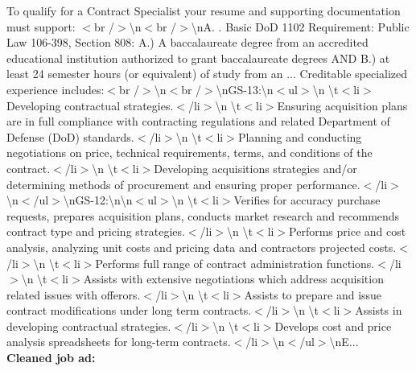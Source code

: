 \documentclass[12pt]{article}
\begin{document}
To qualify for a Contract Specialist your resume and supporting documentation must support: $<$br /$>$\textbackslash n$<$br /$>$\textbackslash nA. . Basic DoD 1102 Requirement: Public Law 106-398, Section 808: A.) A baccalaureate degree from an accredited educational institution authorized to grant baccalaureate degrees AND B.) at least 24 semester hours (or equivalent) of study from an ... Creditable specialized experience includes:$<$br /$>$\textbackslash n$<$br /$>$\textbackslash nGS-13:\textbackslash n$<$ul$>$\textbackslash n \textbackslash t$<$li$>$Developing contractual strategies.$<$/li$>$\textbackslash n \textbackslash t$<$li$>$Ensuring acquisition plans are in full compliance with contracting regulations and related Department of Defense (DoD) standards.$<$/li$>$\textbackslash n \textbackslash t$<$li$>$Planning and conducting negotiations on price, technical requirements, terms, and conditions of the contract.$<$/li$>$\textbackslash n \textbackslash t$<$li$>$Developing acquisitions strategies and/or determining methods of procurement and ensuring proper performance.$<$/li$>$\textbackslash n$<$/ul$>$\textbackslash nGS-12:\textbackslash n\textbackslash n$<$ul$>$\textbackslash n \textbackslash t$<$li$>$Verifies for accuracy purchase requests, prepares acquisition plans, conducts market research and recommends contract type and pricing strategies.$<$/li$>$\textbackslash n \textbackslash t$<$li$>$Performs price and cost analysis, analyzing unit costs and pricing data and contractors projected costs.$<$/li$>$\textbackslash n \textbackslash t$<$li$>$Performs full range of contract administration functions.$<$/li$>$\textbackslash n \textbackslash t$<$li$>$Assists with extensive negotiations which address acquisition related issues with offerors.$<$/li$>$\textbackslash n \textbackslash t$<$li$>$Assists to prepare and issue contract modifications under long term contracts.$<$/li$>$\textbackslash n \textbackslash t$<$li$>$Assists in developing contractual strategies.$<$/li$>$\textbackslash n \textbackslash t$<$li$>$Develops cost and price analysis spreadsheets for long-term contracts.$<$/li$>$\textbackslash n$<$/ul$>$\textbackslash nE...\\

\noindent \textbf{Cleaned job ad:}\\
\end{document}
